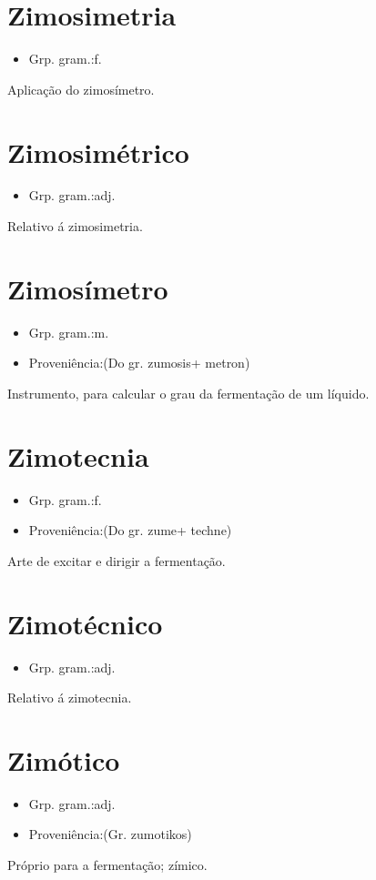\section{Zimosimetria}
\begin{itemize}
\item {Grp. gram.:f.}
\end{itemize}
Aplicação do zimosímetro.
\section{Zimosimétrico}
\begin{itemize}
\item {Grp. gram.:adj.}
\end{itemize}
Relativo á zimosimetria.
\section{Zimosímetro}
\begin{itemize}
\item {Grp. gram.:m.}
\end{itemize}
\begin{itemize}
\item {Proveniência:(Do gr. \textunderscore zumosis\textunderscore  + \textunderscore metron\textunderscore )}
\end{itemize}
Instrumento, para calcular o grau da fermentação de um líquido.
\section{Zimotecnia}
\begin{itemize}
\item {Grp. gram.:f.}
\end{itemize}
\begin{itemize}
\item {Proveniência:(Do gr. \textunderscore zume\textunderscore  + \textunderscore techne\textunderscore )}
\end{itemize}
Arte de excitar e dirigir a fermentação.
\section{Zimotécnico}
\begin{itemize}
\item {Grp. gram.:adj.}
\end{itemize}
Relativo á zimotecnia.
\section{Zimótico}
\begin{itemize}
\item {Grp. gram.:adj.}
\end{itemize}
\begin{itemize}
\item {Proveniência:(Gr. \textunderscore zumotikos\textunderscore )}
\end{itemize}
Próprio para a fermentação; zímico.
